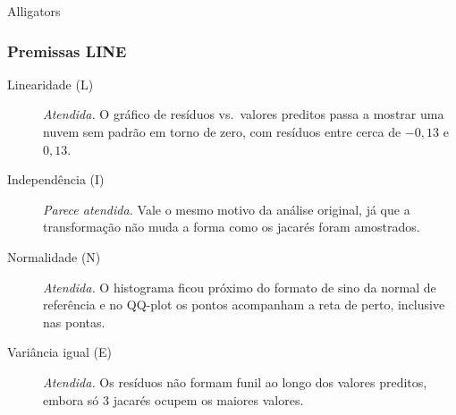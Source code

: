 \begin{dataset}{Alligators}

\subsubsection{Premissas LINE}

\begin{description}
    \item[Linearidade (L)] \textit{Atendida.} O gráfico de resíduos vs.\ valores preditos passa a mostrar uma nuvem sem padrão em torno de zero, com resíduos entre cerca de $-0{,}13$ e $0{,}13$.
    \item[Independência (I)] \textit{Parece atendida.} Vale o mesmo motivo da análise original, já que a transformação não muda a forma como os jacarés foram amostrados.
    \item[Normalidade (N)] \textit{Atendida.} O histograma ficou próximo do formato de sino da normal de referência e no QQ-plot os pontos acompanham a reta de perto, inclusive nas pontas.
    \item[Variância igual (E)] \textit{Atendida.} Os resíduos não formam funil ao longo dos valores preditos, embora só 3 jacarés ocupem os maiores valores.
\end{description}

\end{dataset}


